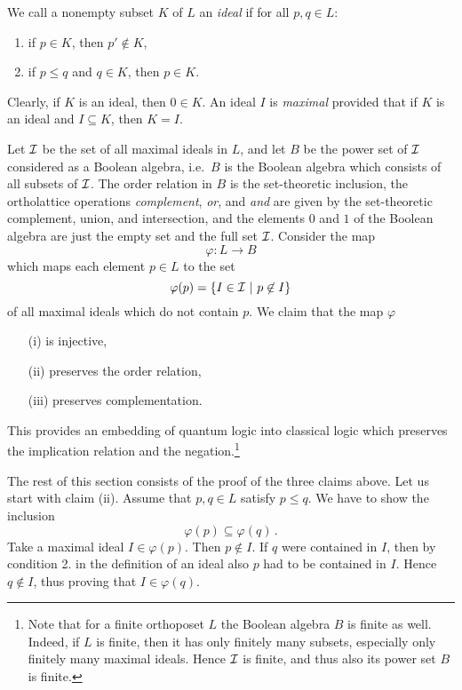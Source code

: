 We call a nonempty subset $K$ of $L$ an {\em ideal} if for all $p,q\in L$:
\begin{enumerate}
\item  if $p\in K$, then $p'\not \in K$,
\item if  $p\le q$ and $q\in K$, then $p\in K $.
\end{enumerate}
Clearly, if $K$ is an ideal, then  $0\in K$. An ideal $I$ is {\em maximal}
provided that if $K$ is an
ideal and $I\subseteq K$, then $K=I$.

Let ${\cal I}$ be the set of all maximal ideals in $L$, and let $B$ be the
power set of ${\cal I}$ considered as a Boolean algebra, i.e.\ $B$ is the
Boolean algebra which consists of all subsets of ${\cal I}$. The order
relation in $B$ is the set-theoretic inclusion, the ortholattice operations
{\em complement}, {\em or}, and {\em and} are given by the set-theoretic
complement,  union, and  intersection, and the elements $0$ and $1$ of the
Boolean algebra are just the empty set and the full set ${\cal I}$.
Consider the map
\[ \varphi:L \to B \]
which maps each element $p \in L$ to the set
\[   \varphi(p) = \{ I \in {\cal I} \ | \ p \not\in I \} \]
of all maximal ideals which do not contain $p$.
We claim that the map $\varphi$
\begin{enumerate}
\item[(i)] is injective,
\item[(ii)]  preserves the order relation,
\item[(iii)]  preserves  complementation.
\end{enumerate}
This provides an embedding of quantum logic into classical logic which
preserves the implication relation and the negation.\footnote{Note that for
a finite orthoposet $L$
the Boolean algebra $B$ is finite as well. Indeed, if $L$ is finite, then
it has only finitely many
subsets, especially only finitely many maximal ideals. Hence ${\cal I}$ is
finite, and thus also
its power set $B$ is finite.}

The rest of this section consists of the proof of the three claims above.
Let us start with claim (ii). Assume that $p,q \in L$ satisfy
$p \leq q$. We have to
show the inclusion
\[ \varphi(p) \subseteq \varphi(q) \,.\]
Take a maximal ideal $I \in \varphi(p)$. Then $p \not\in I$. If $q$ were
contained in $I$, then by condition 2. in
the definition of an ideal also $p$ had to be
contained in $I$. Hence $q \not\in I$, thus proving that $I \in \varphi(q)$.

